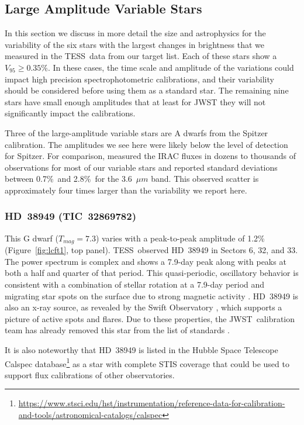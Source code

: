 \documentclass[twocolumn, linenumbers]{aastex631}
\newcommand{\jwst}{JWST}
\newcommand{\tess}{TESS}
\begin{document}
\subsection{Large Amplitude Variable Stars}

In this section we discuss in more detail the size and astrophysics for the variability of the six stars with the largest changes in brightness that we measured in the \tess\ data from our target list. Each of these stars show a $V_{95}\ge0.35$\%. In these cases, the time scale and amplitude of the variations could impact high precision spectrophotometric calibrations, and their variability should be considered before using them as a standard star. The remaining nine stars have small enough amplitudes that at least for JWST they will not significantly impact the calibrations. 

Three of the large-amplitude variable stars are A dwarfs from the \citet{Reach2005} Spitzer calibration. The amplitudes we see here were likely below the level of detection for Spitzer. For comparison, \citet{Krick2021IRAC} measured the IRAC fluxes in dozens to thousands of observations for most of our variable stars and reported standard deviations between 0.7\%\ and 2.8\%\ for the 3.6~$\mu m$ band.  This observed scatter is approximately four times larger than the variability we report here.


\subsubsection{HD~38949 (TIC~32869782)}

This G dwarf ($T_{mag}=7.3$) varies with a peak-to-peak amplitude of 1.2\% (Figure~\ref{fig:lcft1}, top panel). \tess\ observed HD~38949 in Sectors 6, 32, and 33.  The power spectrum is complex and shows a 7.9-day peak along with peaks at both a half and quarter of that period. This quasi-periodic, oscillatory behavior is consistent with a combination of stellar rotation at a 7.9-day period and migrating star spots on the surface due to strong magnetic activity \citep{Santos2021}.  HD~38949 is also an x-ray source, as revealed by the Swift Observatory \citep{Swift2020,Evans2020vizier}, which supports a picture of active spots and flares. Due to these properties, the \jwst\ calibration team has already removed this star from the list of standards \citep{Gordon2022inprep}.

It is also noteworthy that HD~38949 is listed in the Hubble Space Telescope Calspec database\footnote{\url{https://www.stsci.edu/hst/instrumentation/reference-data-for-calibration-and-tools/astronomical-catalogs/calspec}} \citep{Bohlin2014PASP126} as a star with complete STIS coverage that could be used to support flux calibrations of other observatories.
\end{document}
